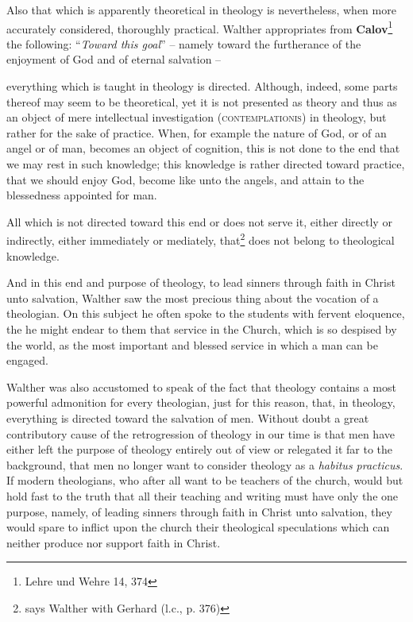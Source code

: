 Also that which is apparently theoretical in theology is nevertheless, when more accurately considered, thoroughly practical.  Walther appropriates from \textbf{Calov}\footnote{Lehre und Wehre 14, 374} the following:  “\textit{Toward this goal}” -- namely toward the furtherance of the enjoyment of God and of eternal salvation -- \begin{fancyquotes} everything which is taught in theology is directed.  Although, indeed, some parts thereof may seem to be theoretical, yet it is not presented as theory and thus as an object of mere intellectual investigation {\scriptsize\textsc{(contemplationis)}} in theology, but rather for the sake of practice.  When, for example the nature of God, or of an angel or of man, becomes an object of cognition, this is not done to the end that we may rest in such knowledge; this knowledge is rather directed toward practice, that we should enjoy God, become like unto the angels, and attain to the blessedness appointed for man. \par All which is not directed toward this end or does not serve it, either directly or indirectly, either immediately or mediately, that\footnote{says Walther with Gerhard (l.c., p. 376)} does not belong to theological knowledge.\end{fancyquotes}


And in this end and purpose of theology, to lead sinners through faith in Christ unto salvation, Walther saw the most precious thing about the vocation of a theologian.  On this subject he often spoke to the students with fervent eloquence, the he might endear to them that service in the Church, which is so despised by the world, as the most important and blessed service in which a man can be engaged.


Walther was also accustomed to speak of the fact that theology contains a most powerful admonition for every theologian, just for this reason, that, in theology, everything is directed toward the salvation of men.  Without doubt a great contributory cause of the retrogression of theology in our time is that men have either left the purpose of theology entirely out of view or relegated it far to the background, that men no longer want to consider theology as a \textit{habitus practicus}.  If modern theologians, who after all want to be teachers of the church, would but hold fast to the truth that all their teaching and writing must have only the one purpose, namely, of leading sinners through faith in Christ unto salvation, they would spare to inflict upon the church their theological speculations which can neither produce nor support faith in Christ.

 

